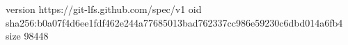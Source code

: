 version https://git-lfs.github.com/spec/v1
oid sha256:b0a07f4d6ee1fdf462e244a77685013bad762337cc986e59230c6dbd014a6fb4
size 98448
